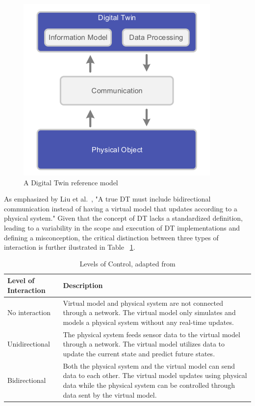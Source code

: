 \begin{figure}[h]
    \centering
    \includegraphics[width=0.4\linewidth]{figs/dt_reference_model.png}
    \caption{A Digital Twin reference model \cite{dt_model}}
    \label{f:dt-structure}
\end{figure}


As emphasized by Liu et al.~\cite{liu2022state}, "A true DT must include bidirectional communication instead of having a virtual model that updates
according to a physical system." 
Given that the concept of \ac{DT} lacks a standardized definition, leading to a variability in the scope and execution of \ac{DT} implementations and
defining a misconception, the critical distinction between three types of interaction is further ilustrated in Table
~\ref{tab:levels_of_control}.

\begin{table}[ht]
    \centering
    \caption{Levels of Control, adapted from \cite{liu2022state}}
    \label{tab:levels_of_control}
    \begin{tabular}{@{}l>{\raggedright\arraybackslash}p{10cm}@{}}
    \toprule
    Level of Interaction & Description \\ 
    \midrule
    No interaction & Virtual model and physical system are not connected through a network. The virtual model only simulates and models a physical 
    system without any real-time updates. \\ \hline
    Unidirectional & The physical system feeds sensor data to the virtual model through a network. The virtual model utilizes data to update the 
    current state and predict future states. \\ \hline
    Bidirectional & Both the physical system and the virtual model can send data to each other. The virtual model updates using physical data while 
    the physical system can be controlled through data sent by the virtual model. \\ 
    \bottomrule
    \end{tabular}
\end{table}







